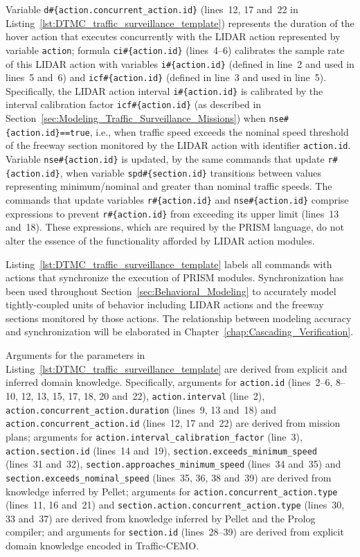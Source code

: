 Variable \texttt{d\#\{action.concurrent\_action.id\}} (lines~12, 17 and~22 in Listing~\ref{lst:DTMC_traffic_surveillance_template}) represents the duration of the hover action that executes concurrently with the LIDAR action represented by variable \texttt{action}; formula \texttt{ci\#\{action.id\}} (lines~4--6) calibrates the sample rate of this LIDAR action with variables \texttt{i\#\{action.id\}} (defined in line~2 and used in lines~5 and~6) and \texttt{icf\#\{action.id\}} (defined in line~3 and used in line~5). Specifically, the LIDAR action interval \texttt{i\#\{action.id\}} is calibrated by the interval calibration factor \texttt{icf\#\{action.id\}} (as described in Section~\ref{sec:Modeling_Traffic_Surveillance_Missions}) when \texttt{nse\#\{action.id\}==true}, i.e., when traffic speed exceeds the nominal speed threshold of the freeway section monitored by the LIDAR action with identifier \texttt{action.id}. Variable \texttt{nse\#\{action.id\}} is updated, by the same commands that update \texttt{r\#\{action.id\}}, when variable \texttt{spd\#\{section.id\}} transitions between values representing minimum/nominal and greater than nominal traffic speeds. The commands that update variables \texttt{r\#\{ac\-tion.id\}} and \texttt{nse\#\{action.id\}} comprise expressions to prevent \texttt{r\#\{action.id\}} from exceeding its upper limit (lines~13 and~18). These expressions, which are required by the PRISM language, do not alter the essence of the functionality afforded by LIDAR action modules.

Listing~\ref{lst:DTMC_traffic_surveillance_template} labels all commands with actions that synchronize the execution of PRISM modules. Synchronization has been used throughout Section~\ref{sec:Behavioral_Modeling} to accurately model tightly-coupled units of behavior including LIDAR actions and the freeway sections monitored by those actions. The relationship between modeling accuracy and synchronization will be elaborated in Chapter~\ref{chap:Cascading_Verification}.

Arguments for the parameters in Listing~\ref{lst:DTMC_traffic_surveillance_template} are derived from explicit and inferred domain knowledge. Specifically, arguments for \texttt{action.id} (lines~2--6, 8--10, 12, 13, 15, 17, 18, 20 and~22), \texttt{action.interval} (line~2), \texttt{action.concurrent\_action.duration} (lines~9, 13 and~18) and \texttt{action.concurrent\_action.id} (lines~12, 17 and~22) are derived from mission plans; arguments for \texttt{action.interval\_calibration\_factor} (line~3), \texttt{ac\-tion.section.id} (lines~14 and~19), \texttt{section.exceeds\_minimum\_speed} (lines~31 and~32), \texttt{section.approaches\_minimum\_speed} (lines~34 and~35) and \texttt{section.exceeds\_nomi\-nal\_speed} (lines~35, 36, 38 and~39) are derived from knowledge inferred by Pellet; arguments for \texttt{action.concurrent\_action.type} (lines~11, 16 and~21) and \texttt{section.ac\-tion.concurrent\_action.type} (lines~30, 33 and~37) are derived from knowledge inferred by Pellet and the Prolog compiler; and arguments for \texttt{section.id} (lines~28--39) are derived from explicit domain knowledge encoded in Traffic-CEMO\@.


